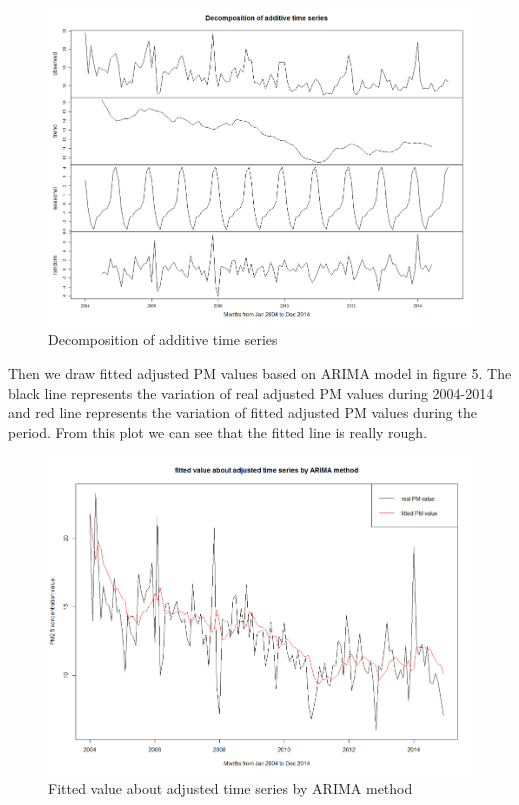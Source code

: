 \documentclass[10pt]{article}
\begin{document}
\begin{figure}[ht!]
\centering
\includegraphics[width = 150mm]{ts4.png}
\caption{Decomposition of additive time series}
\end{figure}

Then we draw fitted adjusted PM values based on ARIMA model in figure 5. The black line represents the variation of real adjusted PM values during 2004-2014  and red line represents the variation of fitted adjusted PM values during the period. From this plot we can see that the fitted line is really rough.

\begin{figure}[H]
\centering
\includegraphics[width = 150mm]{ts5.png}
\caption{Fitted value about adjusted time series by ARIMA method}
\end{figure}
\end{document}
